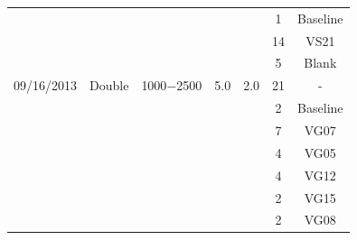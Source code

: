 \documentclass[osajnl,preprint,showpacs,superscriptaddress,12pt]{revtex4-1} %
\begin{document}
\begin{table}[h!]
\begin{center}
\begin{tabular}{c c c c c c c}
	                   &            &                       &       &         &    1 &  Baseline\\
	                   &            &                       &       &         &    14 &  VS21\\	                   
	                   &            &                       &       &         &    5 &  Blank\\
    \hline
    	09/16/2013 & Double & 1000$-$2500 & 5.0 & 2.0  &  21 &   -  \\
	                   &            &                       &       &         &    2 &  Baseline\\
	                   &            &                       &       &         &    7 &  VG07\\	                   
	                   &            &                       &       &         &    4 &  VG05\\	
	                   &            &                       &       &         &    4 &  VG12\\
	                   &            &                       &       &         &    2 &  VG15\\	                   
	                   &            &                       &       &         &    2 &  VG08\\	                   
    \hline
    \end{tabular}
\end{center}
\end{table}
\end{document}
